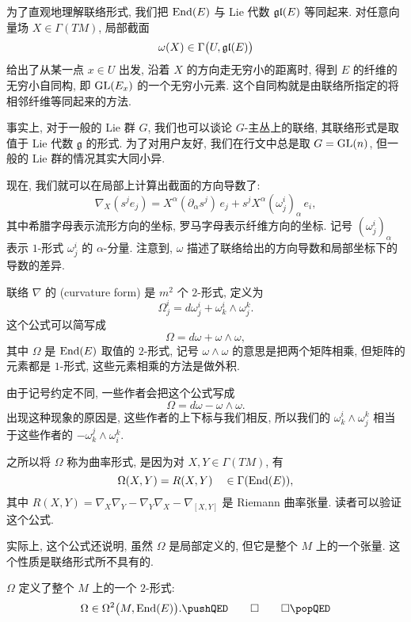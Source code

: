 \begin{remark}
    为了直观地理解联络形式, 我们把 $\operatorname{End} (E)$ 与 Lie 代数 $\mathfrak{gl} (E)$ 等同起来.
    对任意向量场 $X \in \Gamma (TM)$, 局部截面
    \[ \omega (X) \in \Gamma \bigl( U, \mathfrak{gl} (E) \bigr) \]
    给出了从某一点 $x \in U$ 出发, 沿着 $X$ 的方向走无穷小的距离时,
    得到 $E$ 的纤维的无穷小自同构, 即 $\mathrm{GL} (E_x)$ 的一个无穷小元素.
    这个自同构就是由联络所指定的将相邻纤维等同起来的方法.
    
    事实上, 对于一般的 Lie 群 $G$, 我们也可以谈论 $G$-主丛上的联络,
    其联络形式是取值于 Lie 代数 $\mathfrak{g}$ 的形式.
    为了对用户友好, 我们在行文中总是取 $G = \mathrm{GL} (n)$,
    但一般的 Lie 群的情况其实大同小异. \varqed
\end{remark}

现在, 我们就可以在局部上计算出截面的方向导数了:
\[ \nabla_X (s^j e_j) = X^\alpha (\partial_\alpha s^j) \, e_j 
    + s^j X^\alpha (\omega_j^i)_\alpha \, e_i, \]
其中希腊字母表示流形方向的坐标, 罗马字母表示纤维方向的坐标.
记号 $(\omega_j^i)_\alpha$ 表示 $1$-形式 $\omega_j^i$ 的 $\alpha$-分量.
注意到, $\omega$ 描述了联络给出的方向导数和局部坐标下的导数的差异.

\begin{definition}
    联络 $\nabla$ 的 (curvature form)
    是 $m^2$ 个 $2$-形式, 定义为
    \[ \Omega_j^i = d \omega_j^i + \omega_k^i \wedge \omega_j^k. \]
    这个公式可以简写成
    \[ \Omega = d \omega + \omega \wedge \omega, \]
    其中 $\Omega$ 是 $\operatorname{End} (E)$ 取值的 $2$-形式,
    记号 $\omega \wedge \omega$ 的意思是把两个矩阵相乘,
    但矩阵的元素都是 $1$-形式, 这些元素相乘的方法是做外积.
\end{definition}

由于记号约定不同, 一些作者会把这个公式写成
\[ \Omega = d \omega - \omega \wedge \omega. \]
出现这种现象的原因是, 这些作者的上下标与我们相反,
所以我们的 $\omega_k^i \wedge \omega_j^k$
相当于这些作者的 $-\omega_k^j \wedge \omega_i^k$.

之所以将 $\Omega$ 称为曲率形式, 是因为对 $X, Y \in \Gamma (TM)$, 有
\begin{equation} \label{eq-5-omega-equals-r}
    \Omega (X, Y) = R (X, Y) \quad \in \Gamma (\operatorname{End} (E)),
\end{equation} 
其中 $R (X, Y) = \nabla_X \nabla_Y - \nabla_Y \nabla_X - \nabla_{[X, Y]}$
是 Riemann 曲率张量. 读者可以验证这个公式.

实际上, 这个公式还说明, 虽然 $\Omega$ 是局部定义的,
但它是整个 $M$ 上的一个张量. 这个性质是联络形式所不具有的.

\begin{proposition}
    $\Omega$ 定义了整个 $M$ 上的一个 $2$-形式:
    \[ \Omega \in \Omega^2 \bigl( M, \End (E) \bigr). \thmqedhere \]
\end{proposition}

